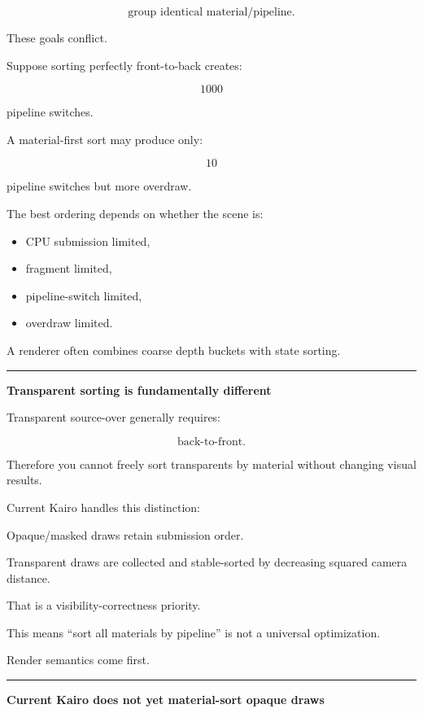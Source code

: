\[
\text{group identical material/pipeline}.
\]

These goals conflict.

Suppose sorting perfectly front-to-back creates:

\[
1000
\]

pipeline switches.

A material-first sort may produce only:

\[
10
\]

pipeline switches but more overdraw.

The best ordering depends on whether the scene is:

\begin{itemize}
\tightlist
\item
  CPU submission limited,
\item
  fragment limited,
\item
  pipeline-switch limited,
\item
  overdraw limited.
\end{itemize}

A renderer often combines coarse depth buckets with state sorting.

\begin{center}\rule{0.5\linewidth}{0.5pt}\end{center}

\textbf{Transparent sorting is fundamentally different}

Transparent source-over generally requires:

\[
\text{back-to-front}.
\]

Therefore you cannot freely sort transparents by material without changing visual results.

Current Kairo handles this distinction:

Opaque/masked draws retain submission order.

Transparent draws are collected and stable-sorted by decreasing squared camera distance.

That is a visibility-correctness priority.

This means ``sort all materials by pipeline'' is not a universal optimization.

Render semantics come first.

\begin{center}\rule{0.5\linewidth}{0.5pt}\end{center}

\textbf{Current Kairo does not yet material-sort opaque draws}

